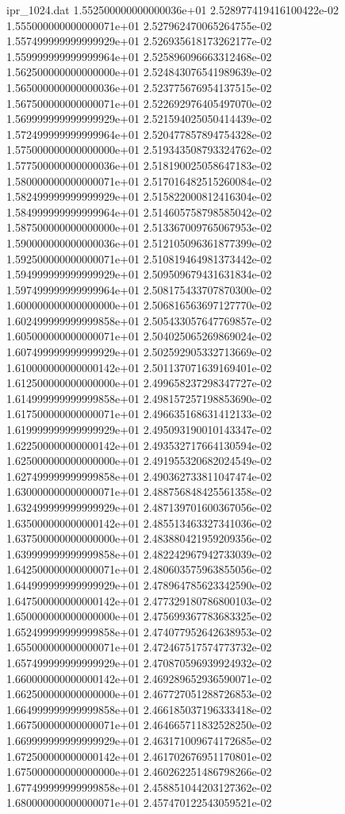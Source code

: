 \begin{filecontents}{ipr_1024.dat}
1.552500000000000036e+01 2.528977419416100422e-02
1.555000000000000071e+01 2.527962470065264755e-02
1.557499999999999929e+01 2.526935618173262177e-02
1.559999999999999964e+01 2.525896096663312468e-02
1.562500000000000000e+01 2.524843076541989639e-02
1.565000000000000036e+01 2.523775676954137515e-02
1.567500000000000071e+01 2.522692976405497070e-02
1.569999999999999929e+01 2.521594025050414439e-02
1.572499999999999964e+01 2.520477857894754328e-02
1.575000000000000000e+01 2.519343508793324762e-02
1.577500000000000036e+01 2.518190025058647183e-02
1.580000000000000071e+01 2.517016482515260084e-02
1.582499999999999929e+01 2.515822000812416304e-02
1.584999999999999964e+01 2.514605758798585042e-02
1.587500000000000000e+01 2.513367009765067953e-02
1.590000000000000036e+01 2.512105096361877399e-02
1.592500000000000071e+01 2.510819464981373442e-02
1.594999999999999929e+01 2.509509679431631834e-02
1.597499999999999964e+01 2.508175433707870300e-02
1.600000000000000000e+01 2.506816563697127770e-02
1.602499999999999858e+01 2.505433057647769857e-02
1.605000000000000071e+01 2.504025065269869024e-02
1.607499999999999929e+01 2.502592905332713669e-02
1.610000000000000142e+01 2.501137071639169401e-02
1.612500000000000000e+01 2.499658237298347727e-02
1.614999999999999858e+01 2.498157257198853690e-02
1.617500000000000071e+01 2.496635168631412133e-02
1.619999999999999929e+01 2.495093190010143347e-02
1.622500000000000142e+01 2.493532717664130594e-02
1.625000000000000000e+01 2.491955320682024549e-02
1.627499999999999858e+01 2.490362733811047474e-02
1.630000000000000071e+01 2.488756848425561358e-02
1.632499999999999929e+01 2.487139701600367056e-02
1.635000000000000142e+01 2.485513463327341036e-02
1.637500000000000000e+01 2.483880421959209356e-02
1.639999999999999858e+01 2.482242967942733039e-02
1.642500000000000071e+01 2.480603575963855056e-02
1.644999999999999929e+01 2.478964785623342590e-02
1.647500000000000142e+01 2.477329180786800103e-02
1.650000000000000000e+01 2.475699367783683325e-02
1.652499999999999858e+01 2.474077952642638953e-02
1.655000000000000071e+01 2.472467517574773732e-02
1.657499999999999929e+01 2.470870596939924932e-02
1.660000000000000142e+01 2.469289652936590071e-02
1.662500000000000000e+01 2.467727051288726853e-02
1.664999999999999858e+01 2.466185037196333418e-02
1.667500000000000071e+01 2.464665711832528250e-02
1.669999999999999929e+01 2.463171009674172685e-02
1.672500000000000142e+01 2.461702676951170801e-02
1.675000000000000000e+01 2.460262251486798266e-02
1.677499999999999858e+01 2.458851044203127362e-02
1.680000000000000071e+01 2.457470122543059521e-02

\end{filecontents}
